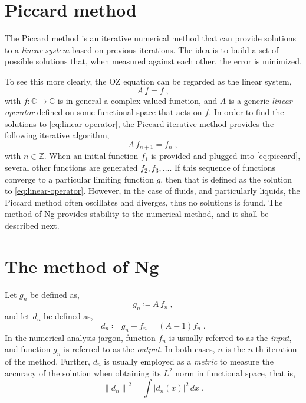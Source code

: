 \section{Piccard method}
The Piccard method is an iterative numerical method that can provide solutions to a 
\emph{linear system} based on previous iterations. The idea is to build a set of possible 
solutions that, when measured against each other, the error is minimized.

To see this more clearly, the OZ equation can be regarded as the linear system,
\begin{equation}
    A \, f = f
    \; ,
    \label{eq:linear-operator}
\end{equation}
with \(f \colon \mathbb{C} \mapsto \mathbb{C}\) is in general a complex-valued function, 
and \(A\) is a generic \emph{linear operator} defined on some functional space that acts on 
\(f\). In order to find the solutions to \autoref{eq:linear-operator}, the Piccard 
iterative method provides the following iterative algorithm,
\begin{equation}
    A \, f_{n+1} = f_{n}
    \; ,
    \label{eq:piccard}
\end{equation}
with \(n \in \mathbb{Z}\). When an initial function \(f_1\) is provided and plugged into
\autoref{eq:piccard}, several other functions are generated \(f_2, f_3, \dots\). If this 
sequence of functions converge to a particular limiting function \(g\), then that is 
defined as the solution to \autoref{eq:linear-operator}. However, in the case of fluids, 
and particularly liquids, the Piccard method often oscillates and diverges, thus no 
solutions is found. The method of Ng provides stability to the numerical method, and it 
shall be described next.

\section{The method of Ng}
Let \(g_n\) be defined as,
\begin{equation}
    g_n \coloneqq A \, f_n
    \: ,
    \label{eq:gn}
\end{equation}
and let \(d_n\) be defined as,
\begin{equation}
    d_n \coloneqq g_n - f_n = (A - 1) f_n
    \; .
    \label{eq:dn}
\end{equation}
In the numerical analysis jargon, function \(f_n\) is usually referred to as the 
\emph{input}, and function \(g_n\) is referred to as the \emph{output}. In both cases, 
\(n\) is the \(n\)-th iteration of the method. Further, \(d_n\) is usually employed as a 
\emph{metric} to measure the accuracy of the solution when obtaining its \(L^2\) norm in 
functional space, that is,
\begin{equation}
    {\left\lVert d_n \right\rVert}^{2} = \int {\left\lvert d_n (x) \right\rvert}^{2} \, dx
    \; .
    \label{eq:precision}
\end{equation}


